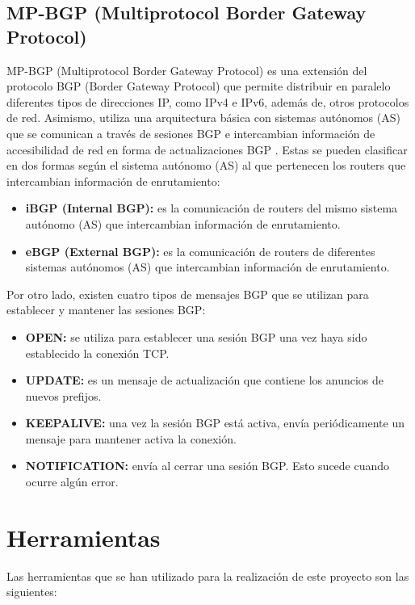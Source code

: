 \subsection{MP-BGP (Multiprotocol Border Gateway Protocol)}
MP-BGP (Multiprotocol Border Gateway Protocol) \cite{wikipedia_mp_bgp} es una extensión del protocolo BGP (Border Gateway Protocol) que permite distribuir en paralelo diferentes tipos de direcciones IP, como IPv4 e IPv6, además de, otros protocolos de red. Asimismo, utiliza una arquitectura básica con sistemas autónomos (AS) que se comunican a través de sesiones BGP e intercambian información de accesibilidad de red en forma de actualizaciones BGP \cite{linkedin_mp_bgp}. Estas se pueden clasificar en dos formas según el sistema autónomo (AS) al que pertenecen los routers que intercambian información de enrutamiento:

\begin{itemize}
  \item \textbf{iBGP (Internal BGP):} es la comunicación de routers del mismo sistema autónomo (AS) que intercambian información de enrutamiento.
  \item \textbf{eBGP (External BGP):} es la comunicación de routers de diferentes sistemas autónomos (AS) que intercambian información de enrutamiento.
\end{itemize}

Por otro lado, existen cuatro tipos de mensajes BGP \cite{wikipedia_bgp} que se utilizan para establecer y mantener las sesiones BGP:
\begin{itemize}
  \item \textbf{OPEN:} se utiliza para establecer una sesión BGP una vez haya sido establecido la conexión TCP.
  \item \textbf{UPDATE:} es un mensaje de actualización que contiene los anuncios de nuevos prefijos.
  \item \textbf{KEEPALIVE:} una vez la sesión BGP está activa, envía periódicamente un mensaje para mantener activa la conexión.
  \item \textbf{NOTIFICATION:} envía al cerrar una sesión BGP. Esto sucede cuando ocurre algún error.
\end{itemize}

\newpage

\section{Herramientas}
Las herramientas que se han utilizado para la realización de este proyecto son las siguientes:

